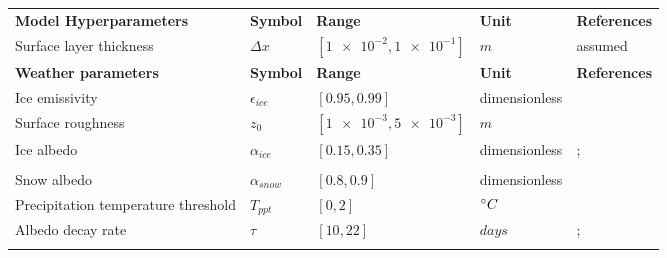 \documentclass[tc, manuscript]{copernicus}
\begin{document}
\begin{table}
\begin{tabular}{lllll}
		\textbf{Model Hyperparameters} & \textbf{Symbol} & \textbf{Range} & \textbf{Unit} & \textbf{References} \\
    Surface layer thickness             & $\Delta x$            & $[\num{1e-2},\num{1e-1}]$           & $m$ & assumed
    \\\midrule
		\textbf{Weather parameters} & \textbf{Symbol} & \textbf{Range} & \textbf{Unit} & \textbf{References} \\
    Ice emissivity                      & $\epsilon_{ice}$      & $[0.95,0.99]$         & dimensionless & \citet{horiInsituMeasuredSpectral2006}             \\
    Surface roughness                   & $z_0$                 & $[\num{1e-3},\num{5e-3}]$            & $m$  & \citet{brockMeasurementParameterizationAerodynamic2006}       \\
    Ice albedo                          & $\alpha_{ice}$        & $[0.15,0.35]$         & dimensionless  &
    \citet{steinerModellingIcecliffBackwasting2015};            \\
    & &    &  & \citet{zollesRobustUncertaintyAssessment2019}      \\
    Snow albedo                         & $\alpha_{snow}$       & $[0.8,0.9]$        & dimensionless  & \citet{zollesRobustUncertaintyAssessment2019}              \\
    Precipitation temperature threshold & $T_{ppt}$             & $[0,2]$            & $^{\circ} C$& \citet{shichangResponseZhadangGlacier2010}  \\
    Albedo decay rate                   & $\tau$                & $[10,22]$           & $days$ &
    \citet{schmidtImportanceAccurateGlacier2017};      \\
    & &    &  & \citet{oerlemansYearRecordGlobal1998}      \\\midrule
	\end{tabular}
\end{table}

\clearpage


\noappendix 

\end{document}
